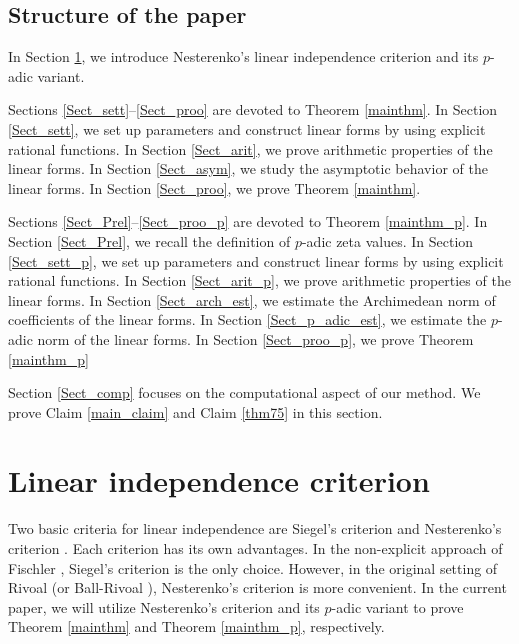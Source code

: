 \documentclass[12pt]{article}
\numberwithin{equation}{section}
\begin{document}
\subsection{Structure of the paper}
In Section \ref{Sect_line}, we introduce Nesterenko's linear independence criterion and its $p$-adic variant. 

Sections \ref{Sect_sett}--\ref{Sect_proo} are devoted to Theorem \ref{mainthm}. In Section \ref{Sect_sett}, we set up parameters and construct linear forms by using explicit rational functions. In Section \ref{Sect_arit}, we prove arithmetic properties of the linear forms. In Section \ref{Sect_asym}, we study the asymptotic behavior of the linear forms. In Section \ref{Sect_proo}, we prove Theorem \ref{mainthm}. 

Sections \ref{Sect_Prel}--\ref{Sect_proo_p} are devoted to Theorem \ref{mainthm_p}. In Section \ref{Sect_Prel}, we recall the definition of $p$-adic zeta values. In Section \ref{Sect_sett_p}, we set up parameters and construct linear forms by using explicit rational functions. In Section \ref{Sect_arit_p}, we prove arithmetic properties of the linear forms. In Section \ref{Sect_arch_est}, we estimate the Archimedean norm of coefficients of the linear forms. In Section \ref{Sect_p_adic_est}, we estimate the $p$-adic norm of the linear forms. In Section \ref{Sect_proo_p}, we prove Theorem \ref{mainthm_p} 

Section \ref{Sect_comp} focuses on the computational aspect of our method. We prove Claim \ref{main_claim} and Claim \ref{thm75} in this section.

\bigskip
\bigskip

\section{Linear independence criterion}\label{Sect_line}

Two basic criteria for linear independence are Siegel's criterion and Nesterenko's criterion \cite{Nes1985}. Each criterion has its own advantages. In the non-explicit approach of Fischler \cite{Fis2021+}, Siegel's criterion is the only choice. However, in the original setting of Rivoal \cite{Riv2000} (or Ball-Rivoal \cite{BR2001}), Nesterenko's criterion is more convenient. In the current paper, we will utilize Nesterenko's criterion and its $p$-adic variant to prove Theorem \ref{mainthm} and Theorem \ref{mainthm_p}, respectively.
\end{document}
